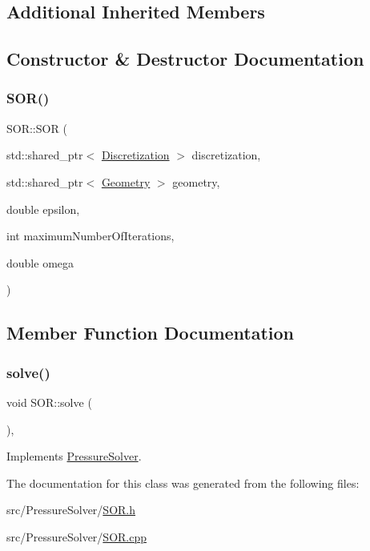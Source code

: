 \subsection*{Additional Inherited Members}


\subsection{Constructor \& Destructor Documentation}
\mbox{\label{classSOR_a2d9d05fd4db988cb3b69c0e7a8cf3950}} 
\subsubsection{\texorpdfstring{SOR()}{SOR()}}
{\footnotesize\ttfamily S\+O\+R\+::\+S\+OR (\begin{DoxyParamCaption}\item[{std\+::shared\+\_\+ptr$<$ \mbox{\hyperlink{classDiscretization}{Discretization}} $>$}]{discretization,  }\item[{std\+::shared\+\_\+ptr$<$ \mbox{\hyperlink{classGeometry}{Geometry}} $>$}]{geometry,  }\item[{double}]{epsilon,  }\item[{int}]{maximum\+Number\+Of\+Iterations,  }\item[{double}]{omega }\end{DoxyParamCaption})}



\subsection{Member Function Documentation}
\mbox{\label{classSOR_a860992d85d8aacf114a3a02b5831f728}} 
\subsubsection{\texorpdfstring{solve()}{solve()}}
{\footnotesize\ttfamily void S\+O\+R\+::solve (\begin{DoxyParamCaption}{ }\end{DoxyParamCaption})\hspace{0.3cm}{\ttfamily [override]}, {\ttfamily [virtual]}}



Implements \mbox{\hyperlink{classPressureSolver_a504ac61a1317650e0eb70d6a93212ca0}{Pressure\+Solver}}.



The documentation for this class was generated from the following files\+:\begin{DoxyCompactItemize}
\item 
src/\+Pressure\+Solver/\mbox{\hyperlink{SOR_8h}{S\+O\+R.\+h}}\item 
src/\+Pressure\+Solver/\mbox{\hyperlink{SOR_8cpp}{S\+O\+R.\+cpp}}\end{DoxyCompactItemize}
